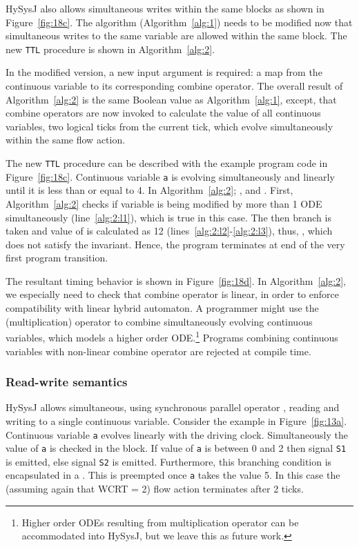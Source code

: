 \documentclass[10pt,journal,cspaper,compsoc]{IEEEtran}
\begin{document}
HySysJ also allows simultaneous writes within the same 
blocks as shown in Figure~\ref{fig:18c}. The algorithm
(Algorithm~\ref{alg:1}) needs to be modified now that simultaneous
writes to the same variable are allowed within the same 
block. The new \texttt{TTL} procedure is shown in Algorithm~\ref{alg:2}.

In the modified version, a new input argument is required: a map from
the continuous variable to its corresponding combine operator. The
overall result of Algorithm~\ref{alg:2} is the same Boolean value as
Algorithm~\ref{alg:1}, except, that combine operators are now invoked to
calculate the value of all continuous variables, two logical ticks from
the current tick, which evolve simultaneously within the same flow
action.

The new \texttt{TTL} procedure can be described with the example program
code in Figure~\ref{fig:18c}. Continuous variable \texttt{a} is evolving
simultaneously and linearly until it is less than or equal to 4. In
Algorithm~\ref{alg:2}; , 
and . First, Algorithm~\ref{alg:2}
checks if variable  is being modified by more than 1 ODE
simultaneously (line~\ref{alg:2:l1}), which is true in this case. The
then branch is taken and value of  is calculated as 12
(lines~\ref{alg:2:l2}-\ref{alg:2:l3}), thus, , which does not satisfy the invariant. Hence, the program
terminates at end of the very first program transition.



The resultant timing behavior is shown in Figure~\ref{fig:18d}. In
Algorithm~\ref{alg:2}, we especially need to check that combine operator
is linear, in order to enforce compatibility with linear hybrid
automaton. A programmer might use the  (multiplication)
operator to combine simultaneously evolving continuous variables, which
models a higher order ODE.\footnote{Higher order ODEs resulting from
  multiplication operator can be accommodated into HySysJ, but we leave
  this as future work.} Programs combining continuous variables with
non-linear combine operator are rejected at compile time.

\subsubsection{Read-write semantics}
\label{sec:read-write-semantics}

HySysJ allows simultaneous, using synchronous parallel operator ,
reading and writing to a single continuous variable. Consider the
example in Figure~\ref{fig:13a}. Continuous variable \texttt{a} evolves
linearly with the driving clock. Simultaneously the value of \texttt{a}
is checked in the  block. If value of \texttt{a} is between
0 and 2 then signal \texttt{S1} is emitted, else signal \texttt{S2} is
emitted. Furthermore, this branching condition is encapsulated in a
. This  is preempted once \texttt{a} takes
the value 5. In this case the (assuming again that WCRT = 2) flow action
terminates after 2 ticks.
\end{document}
